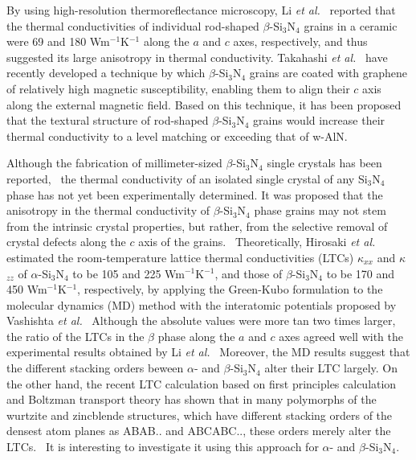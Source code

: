 \documentclass[twocolumn,amsmath,amssymb,a4paper,prb,superscriptaddress,floatfix]{revtex4-1}
\begin{document}
By using high-resolution thermoreflectance microscopy, Li {\it et
al.}~\cite{li} reported that the thermal conductivities of individual
rod-shaped $\beta$-Si$_3$N$_4$ grains in a ceramic were 69 and 180
Wm$^{-1}$K$^{-1}$ along the $a$ and $c$ axes, respectively, and thus suggested
its large anisotropy in thermal conductivity.  Takahashi {\it et al.}~\cite{takahashi} have recently developed a technique by which
$\beta$-Si$_3$N$_4$ grains are coated with graphene of relatively high magnetic
susceptibility, enabling them to align their $c$ axis along the external
magnetic field.  Based on this technique, it has been proposed that the
textural structure of rod-shaped $\beta$-Si$_3$N$_4$ grains would increase
their thermal conductivity to a level matching or exceeding that of w-AlN. 

Although the fabrication of millimeter-sized $\beta$-Si$_3$N$_4$ single
crystals has been reported,~\cite{yamamoto} the thermal conductivity of an
isolated single crystal of any Si$_3$N$_4$ phase has not yet been
experimentally determined.  It was proposed that the anisotropy in the thermal
conductivity of $\beta$-Si$_3$N$_4$ phase grains may not stem from the
intrinsic crystal properties, but rather, from the selective removal of crystal
defects along the $c$ axis of the grains.~\cite{watari-trans} Theoretically,
Hirosaki {\it et al.}~\cite{hirosaki-md} estimated the room-temperature lattice
thermal conductivities (LTCs) $\kappa$$_{xx}$ and $\kappa$$_{zz}$ of
$\alpha$-Si$_3$N$_4$ to be 105 and 225 Wm$^{-1}$K$^{-1}$, and those of
$\beta$-Si$_3$N$_4$ to be 170 and 450 Wm$^{-1}$K$^{-1}$, respectively, by
applying the Green-Kubo formulation to the molecular dynamics (MD) method with
the interatomic potentials proposed by Vashishta {\it et al.}~\cite{vashishta}
Although the absolute values were more tan two times larger, the ratio of the
LTCs in the $\beta$ phase along the $a$ and $c$ axes agreed well with the
experimental results obtained by Li {\it et al.}~\cite{li} Moreover, the MD
results suggest that the different stacking orders beween $\alpha$- and
$\beta$-Si$_3$N$_4$ alter their LTC largely. On the other hand, the recent LTC
calculation based on first principles calculation and Boltzman transport theory
has shown that in many polymorphs of the wurtzite and zincblende structures,
which have different stacking orders of the densest atom planes as ABAB.. and
ABCABC.., these orders merely alter the LTCs.~\cite{phono3py} It is interesting
to investigate it using this approach for $\alpha$- and $\beta$-Si$_3$N$_4$. 
\end{document}
